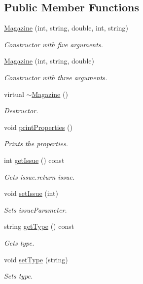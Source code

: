 \subsection*{Public Member Functions}
\begin{DoxyCompactItemize}
\item 
\hyperlink{classMagazine_af32c7b2b56f8553579669f9f3200e2e7}{Magazine} (int, string, double, int, string)
\begin{DoxyCompactList}\small\item\em Constructor with five arguments. \end{DoxyCompactList}\item 
\hyperlink{classMagazine_ad79b115f747f89d5f1cebe268a94e0cb}{Magazine} (int, string, double)
\begin{DoxyCompactList}\small\item\em Constructor with three arguments. \end{DoxyCompactList}\item 
\mbox{\label{classMagazine_a0ba688d442bd6666825132522049da05}} 
virtual \hyperlink{classMagazine_a0ba688d442bd6666825132522049da05}{$\sim$\+Magazine} ()
\begin{DoxyCompactList}\small\item\em Destructor. \end{DoxyCompactList}\item 
\mbox{\label{classMagazine_a64f61943072de7e5c608a52cf5ee86ac}} 
void \hyperlink{classMagazine_a64f61943072de7e5c608a52cf5ee86ac}{print\+Properties} ()
\begin{DoxyCompactList}\small\item\em Prints the properties. \end{DoxyCompactList}\item 
int \hyperlink{classMagazine_a15d88a272355e02568dab18f3df0934a}{get\+Issue} () const
\begin{DoxyCompactList}\small\item\em Gets issue.\+return issue. \end{DoxyCompactList}\item 
void \hyperlink{classMagazine_a19df08bb3f6848601a04f03486d57099}{set\+Issue} (int)
\begin{DoxyCompactList}\small\item\em Sets issue\+Parameter. \end{DoxyCompactList}\item 
string \hyperlink{classMagazine_a46f8e02963fc1c130cc1b3e1f0e67e30}{get\+Type} () const
\begin{DoxyCompactList}\small\item\em Gets type. \end{DoxyCompactList}\item 
void \hyperlink{classMagazine_a29b2f7bd3ec5a76e9a5b0d06d64dec68}{set\+Type} (string)
\begin{DoxyCompactList}\small\item\em Sets type. \end{DoxyCompactList}\end{DoxyCompactItemize}


